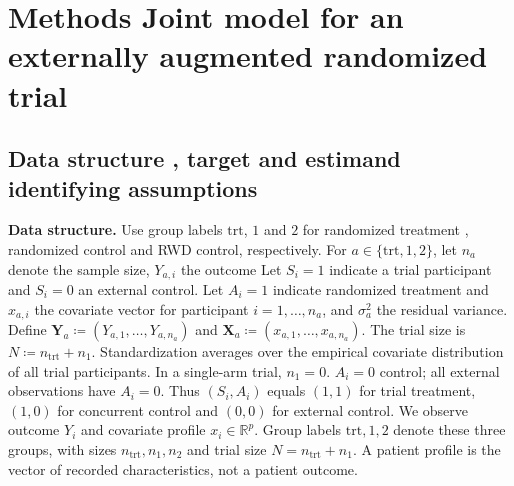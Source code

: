 \documentclass[11pt]{article}
\theoremstyle{remark}\newtheorem{remark}{Remark}[section]
\providecommand{\DIFaddtex}[1]{{\protect\color{blue} \sf #1}} %
\providecommand{\DIFdeltex}[1]{{\protect\color{red} \scriptsize #1}} %
\providecommand{\DIFaddbegin}{} %
\providecommand{\DIFaddend}{} %
\providecommand{\DIFdelbegin}{} %
\providecommand{\DIFdelend}{} %
\providecommand{\DIFadd}[1]{\texorpdfstring{\DIFaddtex{#1}}{#1}} %
\providecommand{\DIFdel}[1]{\texorpdfstring{\DIFdeltex{#1}}{}} %
\begin{document}
\section{\DIFdelbegin \DIFdel{Methods}\DIFdelend \DIFaddbegin \DIFadd{Joint model for an externally augmented randomized trial}\DIFaddend }\DIFaddbegin \label{sec:model}
\DIFaddend \subsection{Data\DIFdelbegin \DIFdel{structure }\DIFdelend \DIFaddbegin \DIFadd{, target }\DIFaddend and \DIFdelbegin \DIFdel{estimand}\DIFdelend \DIFaddbegin \DIFadd{identifying assumptions}\DIFaddend }
\DIFdelbegin %
\DIFdel{\textbf{Data structure.}
Use group labels $\mathrm{trt}$, $1$ and $2$ for randomized treatment , randomized control and RWD control, respectively. For $a\in\{\mathrm{trt},1,2\}$, let $n_a$ denote the sample size, $Y_{a,i}$ the outcome }\DIFdelend \DIFaddbegin \DIFadd{Let $S_i=1$ indicate a trial participant and $S_i=0$ an external control. Let $A_i=1$ indicate randomized treatment }\DIFaddend and \DIFdelbegin \DIFdel{$x_{a,i}$ the covariate vector for participant $i=1,\ldots,n_a$, and $\sigma_a^2$ the residual variance. Define $\mathbf{Y}_a\coloneqq(Y_{a,1},\ldots,Y_{a,n_a})$ and $\mathbf{X}_a\coloneqq(x_{a,1},\ldots,x_{a,n_a})$. The trial size is $N\coloneqq n_{\mathrm{trt}}+n_1$. Standardization averages over the empirical covariate distribution of all trial participants. In a single-arm trial, $n_1=0$.
}\DIFdelend \DIFaddbegin \DIFadd{$A_i=0$ control; all external observations have $A_i=0$. Thus $(S_i,A_i)$ equals $(1,1)$ for trial treatment, $(1,0)$ for concurrent control and $(0,0)$ for external control. We observe outcome $Y_i$ and covariate profile $x_i\in\mathbb R^p$. Group labels $\mathrm{trt},1,2$ denote these three groups, with sizes $n_{\mathrm{trt}},n_1,n_2$ and trial size $N=n_{\mathrm{trt}}+n_1$. A patient profile is the vector of recorded characteristics, not a patient outcome.
}
\end{document}
